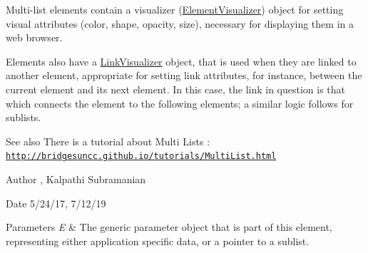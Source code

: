 Multi-\/list elements contain a visualizer (\mbox{\hyperlink{classbridges_1_1datastructure_1_1_element_visualizer}{Element\+Visualizer}}) object for setting visual attributes (color, shape, opacity, size), necessary for displaying them in a web browser.

Elements also have a \mbox{\hyperlink{classbridges_1_1datastructure_1_1_link_visualizer}{Link\+Visualizer}} object, that is used when they are linked to another element, appropriate for setting link attributes, for instance, between the current element and its next element. In this case, the link in question is that which connects the element to the following elements; a similar logic follows for sublists.

\begin{DoxySeeAlso}{See also}
There is a tutorial about Multi Lists \+: \href{http://bridgesuncc.github.io/tutorials/MultiList.html}{\tt http\+://bridgesuncc.\+github.\+io/tutorials/\+Multi\+List.\+html}
\end{DoxySeeAlso}
\begin{DoxyAuthor}{Author}
, Kalpathi Subramanian
\end{DoxyAuthor}
\begin{DoxyDate}{Date}
5/24/17, 7/12/19
\end{DoxyDate}

\begin{DoxyParams}{Parameters}
{\em E} & The generic parameter object that is part of this element, representing either application specific data, or a pointer to a sublist. \\
\hline
\end{DoxyParams}
